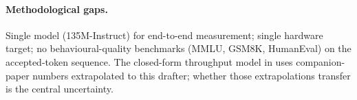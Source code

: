 \documentclass[11pt]{article}
\begin{document}
\paragraph{Methodological gaps.}  Single model (135M-Instruct) for
end-to-end measurement; single hardware target; no behavioural-quality
benchmarks (MMLU, GSM8K, HumanEval) on the accepted-token sequence.  The
closed-form throughput model in  uses
companion-paper numbers extrapolated to this drafter; whether those
extrapolations transfer is the central uncertainty.

\clearpage
\printbibliography
\end{document}

